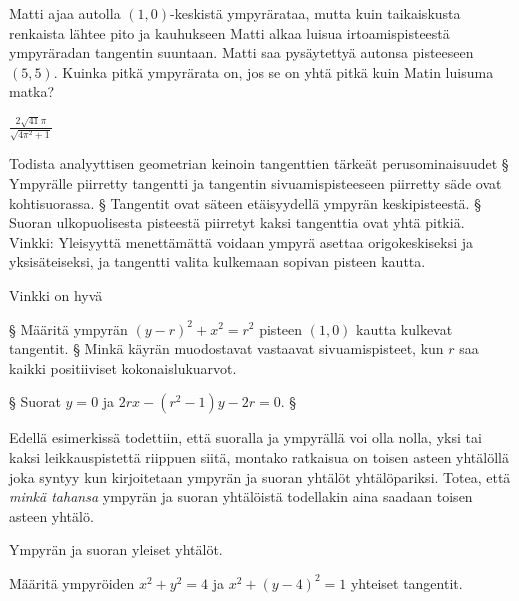\begin{tehtavasivu}
\begin{tehtava}
Matti ajaa autolla $(1,0)$-keskistä ympyrärataa, mutta kuin taikaiskusta renkaista lähtee pito ja kauhukseen Matti alkaa luisua irtoamispisteestä ympyräradan tangentin suuntaan. Matti saa pysäytettyä autonsa pisteeseen $(5,5)$. Kuinka pitkä ympyrärata on, jos se on yhtä pitkä kuin Matin luisuma matka?
\begin{vastaus}
$\frac{2\sqrt{41}\pi}{\sqrt{4\pi^2+1}}$
\end{vastaus}
\end{tehtava}

\begin{tehtava}
Todista analyyttisen geometrian keinoin tangenttien tärkeät perusominaisuudet
\alakohdat
§ Ympyrälle piirretty tangentti ja tangentin sivuamispisteeseen piirretty säde ovat kohtisuorassa.
§ Tangentit ovat säteen etäisyydellä ympyrän keskipisteestä.
§ Suoran ulkopuolisesta pisteestä piirretyt kaksi tangenttia ovat yhtä pitkiä.
\loppu
Vinkki: Yleisyyttä menettämättä voidaan ympyrä asettaa origokeskiseksi ja yksisäteiseksi, ja tangentti valita kulkemaan sopivan pisteen kautta.
\begin{vastaus}
Vinkki on hyvä
\end{vastaus}
\end{tehtava}

\begin{tehtava}
\alakohdat
§ Määritä ympyrän $(y-r)^2+x^2 = r^2$ pisteen $(1,0)$ kautta kulkevat tangentit.
§ Minkä käyrän muodostavat vastaavat sivuamispisteet, kun $r$ saa kaikki positiiviset kokonaislukuarvot.
\loppu
	\begin{vastaus}
		\alakohdat
			§ Suorat $y = 0$ ja $2rx-(r^2-1)y-2r = 0$.
			§
		\loppu
	\end{vastaus}
\end{tehtava}


\begin{tehtava}
Edellä esimerkissä todettiin, että suoralla ja ympyrällä voi olla nolla, yksi tai kaksi leikkauspistettä riippuen siitä, montako ratkaisua on toisen asteen yhtälöllä joka syntyy kun kirjoitetaan ympyrän ja suoran yhtälöt yhtälöpariksi. Totea, että \emph{minkä tahansa} ympyrän ja suoran yhtälöistä todellakin aina saadaan toisen asteen yhtälö.
\begin{vastaus}
Ympyrän ja suoran yleiset yhtälöt.
\end{vastaus}
\end{tehtava}

\begin{tehtava}
Määritä ympyröiden $x^2+y^2 = 4$ ja $x^2+(y-4)^2 = 1$ yhteiset tangentit.


\end{tehtava}
\end{tehtavasivu}
